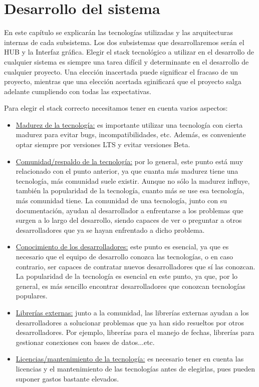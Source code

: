 \chapter{Desarrollo del sistema}
En este capítulo se explicarán las tecnologías utilizadas y las arquitecturas internas de cada subsistema. Los dos subsistemas que desarrollaremos
serán el HUB y la Interfaz gráfica.
\label{chap:desarrollosistema}
Elegir el stack tecnológico a utilizar en el desarrollo de cualquier sistema es siempre una tarea difícil y determinante en el desarrollo de 
cualquier proyecto. Una elección inacertada puede significar el fracaso de un proyecto, mientras que una elección acertada sginificará que el 
proyecto salga adelante cumpliendo con todas las expectativas.
\par
Para elegir el stack correcto necesitamos tener en cuenta varios aspectos:
\begin{itemize}
\item\underline{Madurez de la tecnología:} es importante utilizar una tecnología con cierta madurez para evitar bugs, incompatibilidades, etc. Además, es
conveniente optar siempre por versiones LTS y evitar versiones Beta.
\item\underline{Comunidad/respaldo de la tecnología:} por lo general, este punto está muy relacionado con el punto anterior, ya que cuanta más madurez tiene
una tecnología, más comunidad suele existir. Aunque no sólo la madurez influye, también la popularidad de la tecnología, cuanto más se use esa tecnología,
más comunidad tiene. La comunidad de una tecnología, junto con su documentación, ayudan al desarrollador a enfrentarse a los problemas que surgen a lo
largo del desarrollo, siendo capaces de ver o preguntar a otros desarrolladores que ya se hayan enfrentado a dicho problema.
\item\underline{Conocimiento de los desarrolladores:} este punto es esencial, ya que es necesario que el equipo de desarrollo conozca las tecnologías, o en caso
contrario, ser capaces de contratar nuevos desarrolladores que sí las conozcan. La popularidad de la tecnología es esencial en este punto, ya que, por 
lo general, es más sencillo encontrar desarrolladores que conozcan tecnologías populares.
\item\underline{Librerías externas:} junto a la comunidad, las librerías externas ayudan a los desarrolladores a solucionar problemas que ya han sido resueltos
por otros desarrolladores. Por ejemplo, librerías para el manejo de fechas, librerías para gestionar conexiones con bases de datos...etc.
\item\underline{Licencias/mantenimiento de la tecnología:} es necesario tener en cuenta las licencias y el mantenimiento de las tecnologías antes de elegirlas,
pues pueden suponer gastos bastante elevados.
\end{itemize}

